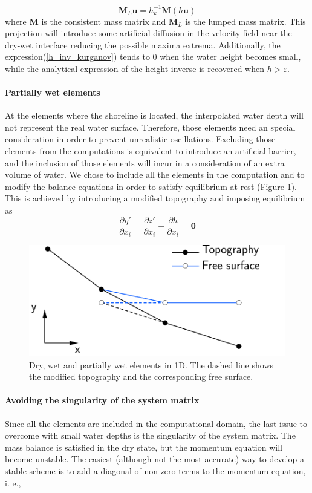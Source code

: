 \documentclass[a4paper,12pt]{article}
\newcommand{\pder}[2]{\frac{\partial#1}{\partial#2}}
\begin{document}
\begin{equation}
\mathbf{M}_L \mathbf{u} = h^{-1}_k \mathbf{M} (h\mathbf{u})
\end{equation}
where $\mathbf{M}$ is the consistent mass matrix and $\mathbf{M}_L$ is the lumped mass matrix. This projection will introduce some artificial diffusion in the velocity field near the dry-wet interface reducing the possible maxima extrema.
Additionally, the expression(\ref{h_inv_kurganov}) tends to $0$ when the water height becomes small, while the analytical expression of the height inverse is recovered when $h>\varepsilon$.


\paragraph{Partially wet elements}
At the elements where the shoreline is located, the interpolated water depth will not represent the real water surface.
Therefore, those elements need an special consideration in order to prevent unrealistic oscillations. Excluding those elements from the computations is equivalent to introduce an artificial barrier, and the inclusion of those elements will incur in a consideration of an extra volume of water.
We chose to include all the elements in the computation and to modify the balance equations in order to satisfy equilibrium at rest (Figure \ref{partially_dry}). This is achieved by introducing a modified topography and imposing equilibrium as
\begin{equation}
    \pder{\eta'}{x_i} = \pder{z'}{x_i} + \pder{h}{x_i} = \mathbf{0}
\end{equation}

\begin{figure}
    \centering
    \includegraphics[width=.5\textwidth]{img/fig/partially_dry.pdf}
    \caption{Dry, wet and partially wet elements in 1D. The dashed line shows the modified topography  and the corresponding free surface.}
    \label{partially_dry}
\end{figure}

\paragraph{Avoiding the singularity of the system matrix}
Since all the elements are included in the computational domain, the last issue to overcome with small water depths is the singularity of the system matrix. The mass balance is satisfied in the dry state, but the momentum equation will become unstable. The easiest (although not the most accurate) way to develop a stable scheme is to add a diagonal of non zero terms to the momentum equation, i. e.,
\end{document}

